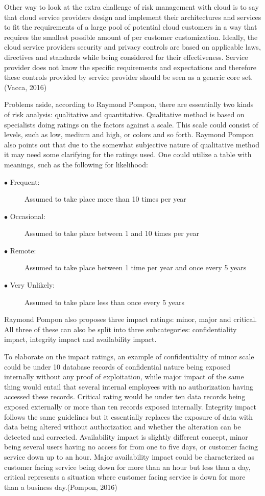 \documentclass{article}
\begin{document}
Other way to look at the extra challenge of risk management with cloud is to say that cloud service providers design and implement their architectures and services to fit the requirements of a large pool of potential cloud customers in a way that requires the smallest possible amount of per customer customization. Ideally, the cloud service providers security and privacy controls are based on applicable laws, directives and standards while being considered for their effectiveness. Service provider does not know the specific requirements and expectations and therefore these controls provided by service provider should be seen as a generic core set. (Vacca, 2016)
\par
Problems aside, according to Raymond Pompon, there are essentially two kinds of risk analysis: qualitative and quantitative. Qualitative method is based on specialists doing ratings on the factors against a scale. This scale could consist of levels, such as low, medium and high, or colors and so forth.
Raymond Pompon also points out that due to the somewhat subjective nature of qualitative method it may need some clarifying for the ratings used. One could utilize a table with meanings, such as the following for likelihood:
\begin{description}
	\item[$\bullet$ Frequent:] Assumed to take place more than 10 times per year
	\item[$\bullet$ Occasional:] Assumed to take place between 1 and 10 times per year
	\item[$\bullet$ Remote:] Assumed to take place between 1 time per year and once every 5 years
	\item[$\bullet$ Very Unlikely:] Assumed to take place less than once every 5 years
\end{description}
Raymond Pompon also proposes three impact ratings: minor, major and critical. All three of these can also be split into three subcategories: confidentiality impact, integrity impact and availability impact.
\par
To elaborate on the impact ratings, an example of confidentiality of minor scale could be under 10 database records of confidential nature being exposed internally without any proof of exploitation, while major impact of the same thing would entail that several internal employees with no authorization having accessed these records. Critical rating would be under ten data records being exposed externally or more than ten records exposed internally. Integrity impact follows the same guidelines but it essentially replaces the exposure of data with data being altered without authorization and whether the alteration can be detected and corrected. Availability impact is slightly different concept, minor being several users having no access for from one to five days, or customer facing service down up to an hour. Major availability impact could be characterized as customer facing service being down for more than an hour but less than a day, critical represents a situation where customer facing service is down for more than a business day.(Pompon, 2016) 
\end{document}
